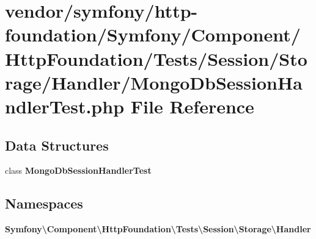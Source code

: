 \section{vendor/symfony/http-\/foundation/\+Symfony/\+Component/\+Http\+Foundation/\+Tests/\+Session/\+Storage/\+Handler/\+Mongo\+Db\+Session\+Handler\+Test.php File Reference}
\label{_mongo_db_session_handler_test_8php}
\subsection*{Data Structures}
\begin{DoxyCompactItemize}
\item 
class {\bf Mongo\+Db\+Session\+Handler\+Test}
\end{DoxyCompactItemize}
\subsection*{Namespaces}
\begin{DoxyCompactItemize}
\item 
 {\bf Symfony\textbackslash{}\+Component\textbackslash{}\+Http\+Foundation\textbackslash{}\+Tests\textbackslash{}\+Session\textbackslash{}\+Storage\textbackslash{}\+Handler}
\end{DoxyCompactItemize}
